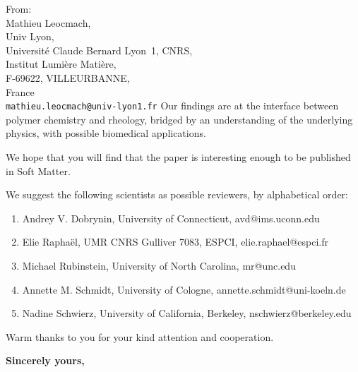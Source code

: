 \documentclass[a4paper, parskip=true, firsthead=false, fromemail=true, foldmarks=false]{scrlttr2}
\newcommand{\journal}{Soft Matter}
\begin{document}
\begin{letter}{From:\\
Mathieu Leocmach,\\
Univ Lyon,\\ 
Universit\'e Claude Bernard Lyon~1, CNRS,\\
Institut Lumi\`ere Mati\`ere,\\
F-69622, VILLEURBANNE,\\
France\\
\texttt{mathieu.leocmach@univ-lyon1.fr}
}
Our findings are at the interface between polymer chemistry and rheology, bridged by an understanding of the underlying physics, with possible biomedical applications.

We hope that you will find that the paper is interesting enough to be published in \journal. 

We suggest the following scientists as possible reviewers, by alphabetical order:
\begin{enumerate} \setlength\itemsep{0em}
\item Andrey V. Dobrynin, University of Connecticut, 
avd@ims.uconn.edu
\item Elie Raphaël, UMR CNRS Gulliver 7083, ESPCI, elie.raphael@espci.fr
\item Michael Rubinstein, University of North Carolina, mr@unc.edu
\item Annette M. Schmidt, University of Cologne, annette.schmidt@uni-koeln.de
\item Nadine Schwierz, University of California, Berkeley, nschwierz@berkeley.edu
\end{enumerate}


Warm thanks to you for your kind attention and cooperation. 


\closing{\bf Sincerely yours,} 

\end{letter} 
\end{document}
